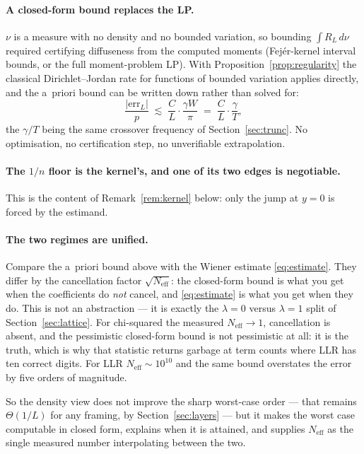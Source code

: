 \documentclass[11pt]{article}
\newcommand{\Neff}{N_{\mathrm{eff}}}
\begin{document}
\paragraph{A closed-form bound replaces the LP.} $\nu$ is a measure with no density and no bounded
variation, so bounding $\int R_L\,d\nu$ required certifying diffuseness from the computed moments
(Fejér-kernel interval bounds, or the full moment-problem LP). With
Proposition~\ref{prop:regularity} the classical Dirichlet--Jordan rate for functions of bounded
variation applies directly, and the a~priori bound can be written down rather than solved for:
\[
  \frac{|\mathrm{err}_L|}{p}\;\lesssim\;\frac{C}{L}\cdot\frac{\gamma W}{\pi}
  \;=\;\frac{C}{L}\cdot\frac{\gamma}{T},
\]
the $\gamma/T$ being the same crossover frequency of Section~\ref{sec:trunc}. No optimisation, no
certification step, no unverifiable extrapolation.

\paragraph{The $1/n$ floor is the kernel's, and one of its two edges is negotiable.} This is the
content of Remark~\ref{rem:kernel} below: only the jump at $y=0$ is forced by the estimand.

\paragraph{The two regimes are unified.} Compare the a~priori bound above with the Wiener estimate
\eqref{eq:estimate}. They differ by the cancellation factor $\sqrt{\Neff}$: the closed-form bound is
what you get when the coefficients do \emph{not} cancel, and \eqref{eq:estimate} is what you get
when they do. This is not an abstraction — it is exactly the $\lambda=0$ versus $\lambda=1$ split of
Section~\ref{sec:lattice}. For chi-squared the measured $\Neff\to1$, cancellation is absent, and the
pessimistic closed-form bound is not pessimistic at all: it is the truth, which is why that
statistic returns garbage at term counts where LLR has ten correct digits. For LLR
$\Neff\sim10^{10}$ and the same bound overstates the error by five orders of magnitude.

So the density view does not improve the sharp worst-case order --- that remains $\Theta(1/L)$ for
any framing, by Section~\ref{sec:layers} --- but it makes the worst case computable in closed form,
explains when it is attained, and supplies $\Neff$ as the single measured number interpolating
between the two.
\end{document}
